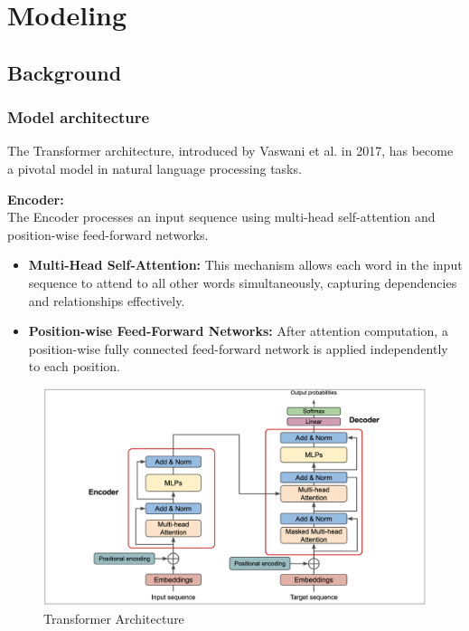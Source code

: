 \chapter{Modeling} 

\section{Background}

\subsection{Model architecture} 

The Transformer architecture, introduced by Vaswani et al. in 2017, has become a pivotal model in natural language processing tasks.

\hfill \break
\textbf{Encoder:} \\
The Encoder processes an input sequence using multi-head self-attention and position-wise feed-forward networks.


\begin{itemize}
    \item \textbf{Multi-Head Self-Attention:} This mechanism allows each word in the input sequence to attend to all other words simultaneously, capturing dependencies and relationships effectively.
    
    \item \textbf{Position-wise Feed-Forward Networks:} After attention computation, a position-wise fully connected feed-forward network is applied independently to each position.
\end{itemize}

\begin{figure}[h!]
	\centering
	\includegraphics[scale=0.3]{figures/transformer.png}
	\caption{Transformer Architecture}
\end{figure}

